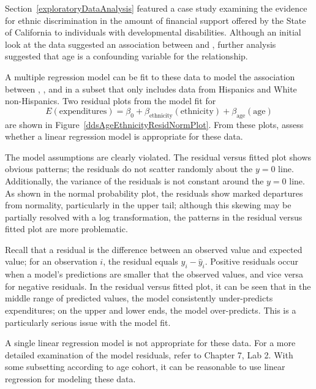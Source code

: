 \begin{examplewrap}
\begin{nexample}{Section~\ref{exploratoryDataAnalysis} featured a case study examining the evidence for ethnic discrimination in the amount of financial support offered by the State of California to individuals with developmental disabilities. Although an initial look at the data suggested an association between  and , further analysis suggested that age is a confounding variable for the relationship.\vspace{3mm}

A multiple regression model can be fit to these data to model the association between , , and  in a subset that only includes data from Hispanics and White non-Hispanics. Two residual plots from the model fit for 
\[E(\text{expenditures}) = \beta_0 +  \beta_{\text{ethnicity}}(\text{ethnicity}) + \beta_{\text{age}}(\text{age}) \]
are shown in Figure~\ref{ddsAgeEthnicityResidNormPlot}. From these plots, assess whether a linear regression model is appropriate for these data.}

The model assumptions are clearly violated. The residual versus fitted plot	shows obvious patterns; the residuals do not scatter randomly about the $y = 0$ line. Additionally, the variance of the residuals is not constant around the $y = 0$ line. As shown in the normal probability plot, the residuals show marked departures from normality, particularly in the upper tail; although this skewing may be partially resolved with a log transformation, the patterns in the residual versus fitted plot are more problematic.

Recall that a residual is the difference between an observed value and expected value; for an observation $i$, the residual equals $y_i - \hat{y}_i$.
Positive residuals occur when a model’s predictions are smaller that the observed values, and vice versa for negative residuals.
In the residual versus fitted plot, it can be seen that in the middle range of predicted values, the model consistently under-predicts expenditures; on the upper and lower ends, the model over-predicts. This is a particularly serious issue with the model fit. 

A single linear regression model is not appropriate for these data. For a more detailed examination of the model residuals, refer to Chapter 7, Lab 2. With some subsetting according to age cohort, it can be reasonable to use linear regression for modeling these data.
\end{nexample}
\end{examplewrap}

